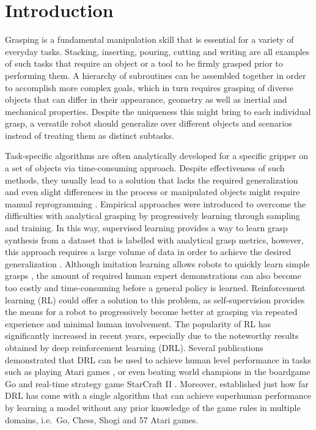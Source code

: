 \chapter{Introduction}

Grasping is a fundamental manipulation skill that is essential for a variety of everyday tasks. Stacking, inserting, pouring, cutting and writing are all examples of such tasks that require an object or a tool to be firmly grasped prior to performing them. A hierarchy of subroutines can be assembled together in order to accomplish more complex goals, which in turn requires grasping of diverse objects that can differ in their appearance, geometry as well as inertial and mechanical properties. Despite the uniqueness this might bring to each individual grasp, a versatile robot should generalize over different objects and scenarios instead of treating them as distinct subtasks.

Task-specific algorithms are often analytically developed for a specific gripper on a set of objects via time-consuming approach. Despite effectiveness of such methods, they usually lead to a solution that lacks the required generalization and even slight differences in the process or manipulated objects might require manual reprogramming \cite{sahbani_overview_2012}. Empirical approaches were introduced to overcome the difficulties with analytical grasping by progressively learning through sampling and training. In this way, supervised learning provides a way to learn grasp synthesis from a dataset that is labelled with analytical grasp metrics, however, this approach requires a large volume of data in order to achieve the desired generalization \cite{mahler_dex-net_2017}. Although imitation learning allows robots to quickly learn simple grasps \cite{zhang_deep_2018}, the amount of required human expert demonstrations can also become too costly and time-consuming before a general policy is learned. Reinforcement learning (RL) \cite{sutton_reinforcement_2018} could offer a solution to this problem, as self-supervision provides the means for a robot to progressively become better at grasping via repeated experience and minimal human involvement. The popularity of RL has significantly increased in recent years, especially due to the noteworthy results obtained by deep reinforcement learning (DRL). Several publications demonstrated that DRL can be used to achieve human level performance in tasks such as playing Atari games \cite{mnih_human-level_2015}, or even beating world champions in the boardgame Go \cite{silver_mastering_2017} and real-time strategy game StarCraft II \cite{vinyals_grandmaster_2019}. Moreover, \citet{schrittwieser_mastering_2020} established just how far DRL has come with a single algorithm that can achieve superhuman performance by learning a model without any prior knowledge of the game rules in multiple domains, i.e.~Go, Chess, Shogi and 57 Atari games.

